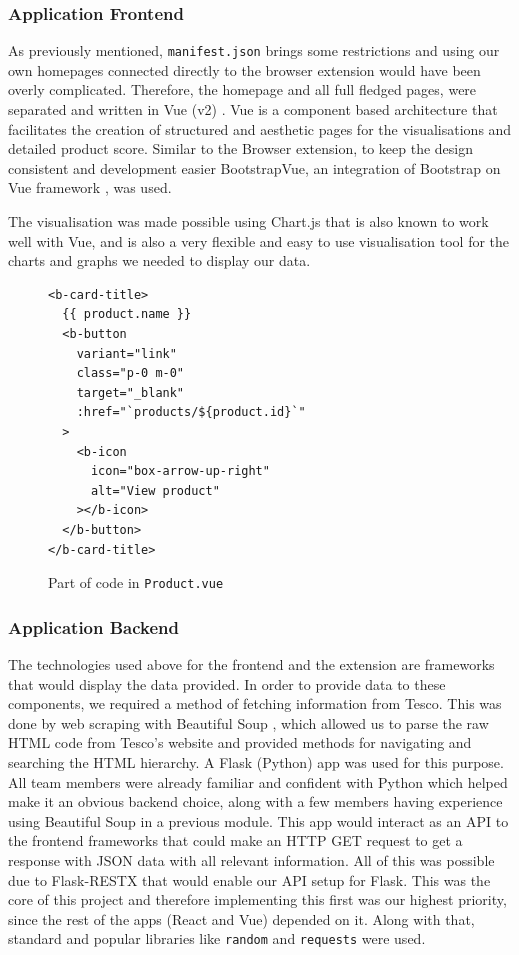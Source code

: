 \documentclass[a4,10pt,twocolumn]{article}
\begin{document}
\subsubsection*{Application Frontend}

As previously mentioned, \texttt{manifest.json} brings some restrictions and using our own homepages connected directly to the browser extension would have been overly complicated. Therefore, the homepage and all full fledged pages, were separated and written in Vue (v2) \cite{Vue2}. Vue is a component based architecture that facilitates the creation of structured and aesthetic pages for the visualisations and detailed product score. %
Similar to the Browser extension, to keep the design consistent and development easier BootstrapVue, an integration of Bootstrap on Vue framework \cite{BootstrapVue}, was used.

The visualisation was made possible using Chart.js \cite{ChartJS} that is also known to work well with Vue, and is also a very flexible and easy to use visualisation tool for the charts and graphs we needed to display our data.

\begin{figure}[h]
\centering
\begin{verbatim}
<b-card-title>
  {{ product.name }}
  <b-button
    variant="link"
    class="p-0 m-0"
    target="_blank"
    :href="`products/${product.id}`"
  >
    <b-icon
      icon="box-arrow-up-right"
      alt="View product"
    ></b-icon>
  </b-button>
</b-card-title>
\end{verbatim}
\caption{Part of code in \texttt{Product.vue}}
\end{figure}

\subsubsection*{Application Backend}

The technologies used above for the frontend and the extension are frameworks that would display the data provided. In order to provide data to these components, we required a method of fetching information from Tesco. This was done by web scraping with Beautiful Soup \cite{BeautifulSoup}, which allowed us to parse the raw HTML code from Tesco's website and provided methods for navigating and searching the HTML hierarchy. A Flask \cite{Flask} (Python) app was used for this purpose. All team members were already familiar and confident with Python which helped make it an obvious backend choice, along with a few members having experience using Beautiful Soup in a previous module. This app would interact as an API to the frontend frameworks that could make an HTTP GET request to get a response with JSON data with all relevant information. All of this was possible due to Flask-RESTX \cite{FlaskRESTX, gtalarico} that would enable our API setup for Flask. This was the core of this project and therefore implementing this first was our highest priority, since the rest of the apps (React and Vue) depended on it. Along with that, standard and popular libraries like \texttt{random} and \texttt{requests} were used.
\end{document}
